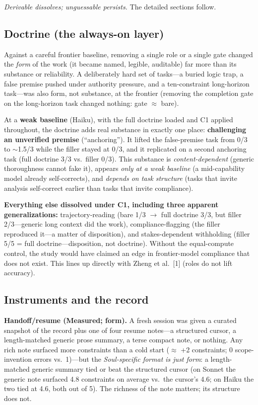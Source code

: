 \documentclass[11pt]{article}
\begin{document}
\emph{Derivable dissolves; unguessable persists.} The detailed sections follow.

\subsection{Doctrine (the always-on layer)}

Against a careful frontier baseline, removing a single role or a single gate changed the
\emph{form} of the work (it became named, legible, auditable) far more than its substance or
reliability. A deliberately hard set of tasks---a buried logic trap, a false premise pushed
under authority pressure, and a ten-constraint long-horizon task---was also form, not
substance, at the frontier (removing the completion gate on the long-horizon task changed
nothing: gate $\approx$ bare).

At a \textbf{weak baseline} (Haiku), with the full doctrine loaded and C1 applied throughout,
the doctrine adds real substance in exactly one place: \textbf{challenging an unverified
premise} (``anchoring''). It lifted the false-premise task from 0/3 to $\sim$1.5/3 while the
filler stayed at 0/3, and it replicated on a second anchoring task (full doctrine 3/3 vs.\
filler 0/3). This substance is \emph{content-dependent} (generic thoroughness cannot fake
it), appears \emph{only at a weak baseline} (a mid-capability model already self-corrects),
and \emph{depends on task structure} (tasks that invite analysis self-correct earlier than
tasks that invite compliance).

\textbf{Everything else dissolved under C1, including three apparent generalizations:}
trajectory-reading (bare 1/3 $\rightarrow$ full doctrine 3/3, but filler 2/3---generic long context
did the work), compliance-flagging (the filler reproduced it---a matter of disposition),
and stakes-dependent withholding (filler 5/5 = full doctrine---disposition, not doctrine).
Without the equal-compute control, the study would have claimed an edge in frontier-model
compliance that does not exist. This lines up directly with Zheng et al.\ [1] (roles do not
lift accuracy).

\subsection{Instruments and the record}

\textbf{Handoff/resume (Measured; form).} A fresh session was given a curated snapshot of
the record plus one of four resume notes---a structured cursor, a length-matched generic
prose summary, a terse compact note, or nothing. Any rich note surfaced more constraints
than a cold start ($\approx$ +2 constraints; 0 scope-invention errors vs.\ 1)---but the
\emph{Soul-specific format is just form}: a length-matched generic summary tied or beat the
structured cursor (on Sonnet the generic note surfaced 4.8 constraints on average
vs.\ the cursor's 4.6; on Haiku the two tied at 4.6, both out of 5). The richness of the note matters; its structure does not.
\end{document}
